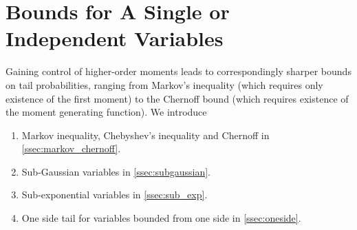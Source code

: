 \documentclass{article}
\begin{document}
\section{Bounds for A Single or Independent Variables}
Gaining control of higher-order moments leads to correspondingly sharper bounds on tail probabilities, ranging from Markov’s inequality (which requires only existence of the first moment) to the Chernoff bound (which requires existence of the moment generating function). We introduce 
\begin{enumerate}
\item Markov inequality, Chebyshev's inequality and Chernoff in \cref{ssec:markov_chernoff}.
\item Sub-Gaussian variables in  \cref{ssec:subgaussian}.
\item Sub-exponential variables in  \cref{ssec:sub_exp}.
\item One side tail for variables bounded from one side in   \cref{ssec:oneside}.
\end{enumerate}
\end{document}
